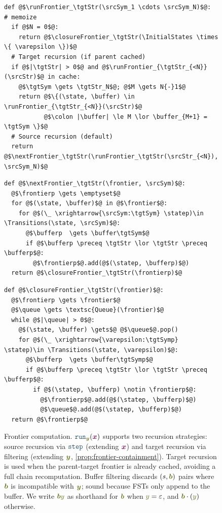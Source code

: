 \documentclass{article}
\theoremstyle{plain}
\newcommand{\mymacro}[1]{#1}
\newcommand{\srcSym}{{\color{TokenColor}x}}
\newcommand{\srcStr}{\ensuremath{{\color{TokenColor}\boldsymbol{x}}}\xspace}
\newcommand{\tgtSym}{{\color{CharacterColor}y}}
\newcommand{\tgtSymp}{{\color{CharacterColor}y^\prime}}
\newcommand{\tgtStr}{{\color{CharacterColor}\boldsymbol{y}}}
\newcommand{\Transitions}{\mymacro{\mathsf{T}}}
\newcommand{\InitialStates}[0]{\mymacro{\mathsf{I}}}
\newcommand{\state}{\mymacro{s}}
\newcommand{\statep}{\mymacro{s^\prime}}
\newcommand{\queue}[0]{\texttt{q}}
\newcommand{\frontier}{\mathcal{F}}
\newcommand{\frontierp}{\frontier^\prime}
\newcommand{\buffer}{{\color{CharacterColor}\boldsymbol{b}}}
\newcommand{\bufferp}{{\color{CharacterColor}\boldsymbol{b}'}}
\newcommand{\myMintedFunc}[1]{\mbox{\texttt{{\color{StormBlue}#1}}}}
\newcommand{\runFrontier}[0]{\myMintedFunc{run}}
\newcommand{\nextFrontier}[0]{\myMintedFunc{step}}
\newcommand{\closureFrontier}[0]{\myMintedFunc{closure}}
\begin{document}
\begin{figure}[H]
\centering
\begin{minipage}[t]{.35\linewidth}
\begin{verbatim}
def @$\runFrontier_\tgtStr(\srcSym_1 \cdots \srcSym_N)$@:  # memoize
  if @$N = 0$@:
    return @$\closureFrontier_\tgtStr(\InitialStates \times \{ \varepsilon \})$@
  # Target recursion (if parent cached)
  if @$|\tgtStr| > 0$@ and @$\runFrontier_{\tgtStr_{<N}}(\srcStr)$@ in cache:
    @$\tgtSym \gets \tgtStr_N$@; @$M \gets N{-}1$@
    return @$\{(\state, \buffer) \in \runFrontier_{\tgtStr_{<N}}(\srcStr)$@
           @$\colon |\buffer| \le M \lor \buffer_{M+1} = \tgtSym \}$@
  # Source recursion (default)
  return @$\nextFrontier_\tgtStr(\runFrontier_\tgtStr(\srcStr_{<N}), \srcSym_N)$@
\end{verbatim}
\end{minipage}
\hfill
\begin{minipage}[t]{.30\linewidth}
\begin{verbatim}
def @$\nextFrontier_\tgtStr(\frontier, \srcSym)$@:
  @$\frontierp \gets \emptyset$@
  for @$(\state, \buffer)$@ in @$\frontier$@:
    for @$(\_ \xrightarrow{\srcSym:\tgtSym} \statep)\in \Transitions(\state, \srcSym)$@:
      @$\bufferp  \gets \buffer\tgtSym$@
      if @$\bufferp \preceq \tgtStr \lor \tgtStr \preceq \bufferp$@:
        @$\frontierp$@.add(@$(\statep, \bufferp)$@)
  return @$\closureFrontier_\tgtStr(\frontierp)$@
\end{verbatim}
\end{minipage}
\hfill
\begin{minipage}[t]{.30\linewidth}
\begin{verbatim}
def @$\closureFrontier_\tgtStr(\frontier)$@:
  @$\frontierp \gets \frontier$@
  @$\queue \gets \textsc{Queue}(\frontier)$@
  while @$|\queue| > 0$@:
    @$(\state, \buffer) \gets$@ @$\queue$@.pop()
    for @$(\_ \xrightarrow{\varepsilon:\tgtSymp} \statep)\in \Transitions(\state, \varepsilon)$@:
      @$\bufferp  \gets \buffer\tgtSymp$@
      if @$\bufferp \preceq \tgtStr \lor \tgtStr \preceq \bufferp$@:
        if @$(\statep, \bufferp) \notin \frontierp$@:
          @$\frontierp$@.add(@$(\statep, \bufferp)$@)
          @$\queue$@.add(@$(\statep, \bufferp)$@)
  return @$\frontierp$@
\end{verbatim}
\end{minipage}
\caption{Frontier computation.
$\runFrontier_\tgtStr(\srcStr)$ supports two recursion strategies:
source recursion via $\nextFrontier$ (extending $\srcStr$) and
target recursion via filtering (extending $\tgtStr$,
\cref{prop:frontier-containment}).
Target recursion is used when the parent-target frontier is already cached,
avoiding a full chain recomputation.
Buffer filtering discards $(\state, \buffer)$ pairs where $\buffer$ is
incompatible with $\tgtStr$; sound because FSTs only append to the buffer.
We write $\buffer\tgtSym$ as shorthand for $\buffer$ when $\tgtSym = \varepsilon$,
and $\buffer \cdot (\tgtSym)$ otherwise.}
\label{fig:frontier}
\end{figure}
\end{document}
